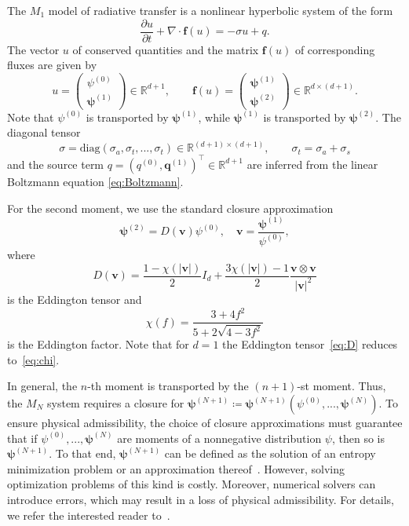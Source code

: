 \documentclass[preprint, 11pt]{elsarticle}
\newcommand{\R}{\mathbb{R}}
\newcommand{\vel}{\mathbf{v}}
\newcommand{\f}{\mathbf{f}}
\newcommand{\dv}{\nabla\cdot}
\newcommand{\pz}{\psi^{(0)}}
\newcommand{\po}{\boldsymbol{\psi}^{(1)}}
\newcommand{\pt}{\boldsymbol{\psi}^{(2)}}
\begin{document}
The $M_1$ model of radiative transfer is a
nonlinear hyperbolic system of the form
\begin{equation}\label{eq:M1}
    \frac{\partial u}{\partial t} + \dv \f(u) = -\sigma u + q.
\end{equation}
The vector $u$ of conserved quantities and the matrix
 $\f(u)$ of corresponding fluxes are given by
\begin{equation*}
  u=\left(\begin{array}{cc}
         \pz\\
         \po
  \end{array}\right)\in\R^{d+1},
  \qquad
    \f(u) = \left(\begin{array}{cc}
         \po\\
         \pt
    \end{array}\right)\in\R^{d\times (d+1)}.
\end{equation*}
Note that $\pz$ is transported by $\po$, while
$\po$ is transported by $\pt$.
The  diagonal  tensor
$$\sigma = \mathrm{diag}(\sigma_a, \sigma_t,..., \sigma_t)\in \R^{(d+1)\times(d+1)},
\qquad \sigma_t = \sigma_a +\sigma_s$$
 and the source term
$q = (q^{(0)}, \mathbf{q}^{(1)})^\top\in\R^{d+1}$
 are inferred from the linear Boltzmann equation \eqref{eq:Boltzmann}.

For the second moment, we use the standard closure approximation~\cite{levermore1984}
\begin{equation}\label{eq:M1closure}
    \pt = D\left(\vel\right)\pz, \quad \vel = \frac{\po}{\pz},
\end{equation}
where
\begin{equation}\label{eq:D}
    D(\vel) = \frac{1-\chi(|\vel|)}{2} I_d + \frac{3\chi(|\vel|)-1}{2} \frac{\vel \otimes \vel}{|\vel|^2}
\end{equation}
is the Eddington tensor and
\begin{equation}\label{eq:chi}
    \chi(f) = \frac{3+4f^2}{5+2\sqrt{4-3f^2}}
\end{equation}
is the Eddington factor.
Note that for $d = 1$ the Eddington tensor~\eqref{eq:D} reduces to~\eqref{eq:chi}.


\begin{remark}
  In general, the $n$-th moment is transported by the $(n+1)$-st moment.
Thus, the $M_N$ system requires a closure for $\bm{\psi}^{(N+1)} \coloneqq \bm{\psi}^{(N+1)} ( \pz, ...,\bm{\psi}^{(N)})$.
To ensure physical admissibility, the choice of closure approximations
must guarantee that if $\pz, ...,\bm{\psi}^{(N)}$ are 
moments of a nonnegative distribution $\psi$, then so is
$\bm{\psi}^{(N+1)}$. To that end, $\bm{\psi}^{(N+1)}$ can be defined as
the solution of an entropy minimization problem or an approximation thereof~\cite{alldredge2012, chidyagwai2018, coulombel2006, levermore1984, pichard2017}. 
However, solving optimization problems of this kind is costly. 
Moreover, numerical solvers can introduce errors, which may result in a loss of physical admissibility. 
For details, we refer the interested reader to~\cite[Sec. 3.4]{pichard2017}.
\end{remark}
\end{document}
